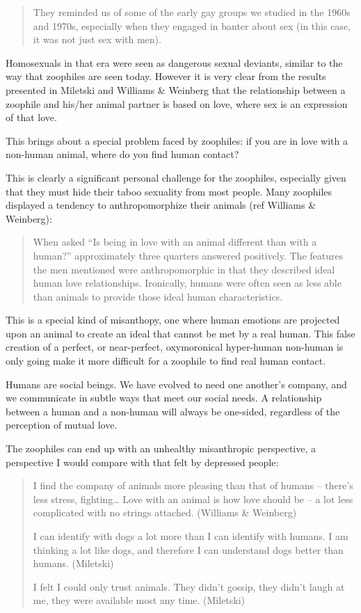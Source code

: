 \begin{quote}
  They reminded us of some of the early gay groups we studied in the 1960s and 1970s, especially when they engaged in banter about sex (in this case, it was not just sex with men).
\end{quote}

Homosexuals in that era were seen as dangerous sexual deviants, similar to the way that zoophiles are seen today. However it is very clear from the results presented in Miletski and Williams \& Weinberg that the relationship between a zoophile and his/her animal partner is based on love, where sex is an expression of that love.

This brings about a special problem faced by zoophiles: if you are in love with a non-human animal, where do you find human contact?

This is clearly a significant personal challenge for the zoophiles, especially given that they must hide their taboo sexuality from most people. Many zoophiles displayed a tendency to anthropomorphize their animals (ref Williams \& Weinberg):

\begin{quote}
  When asked “Is being in love with an animal different than with a human?” approximately three quarters answered positively. The features the men mentioned were anthropomorphic in that they described ideal human love relationships. Ironically, humans were often seen as less able than animals to provide those ideal human characteristics.
\end{quote}

This is a special kind of misanthopy, one where human emotions are projected upon an animal to create an ideal that cannot be met by a real human. This false creation of a perfect, or near-perfect, oxymoronical hyper-human non-human is only going make it more difficult for a zoophile to find real human contact.

Humans are social beings. We have evolved to need one another's company, and we communicate in subtle ways that meet our social needs. A relationship between a human and a non-human will always be one-sided, regardless of the perception of mutual love.

The zoophiles can end up with an unhealthy misanthropic perspective, a perspective I would compare with that felt by depressed people:

\begin{quotation}
  I find the company of animals more pleasing than that of humans – there's less stress, fighting… Love with an animal is how love should be – a lot less complicated with no strings attached. (Williams \& Weinberg)

  I can identify with dogs a lot more than I can identify with humans. I am thinking a lot like dogs, and therefore I can understand dogs better than humans. (Miletski)

  I felt I could only trust animals. They didn't gossip, they didn't laugh at me, they were available most any time. (Miletski)
\end{quotation}

